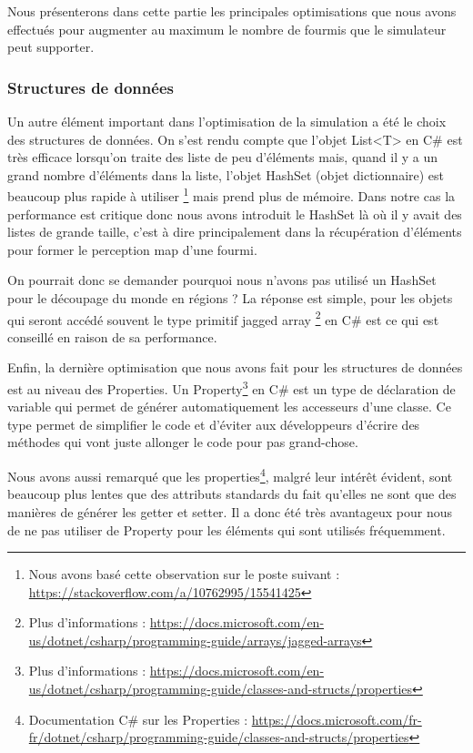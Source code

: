 \documentclass{EPUProjetDi}
\begin{document}
Nous présenterons dans cette partie les principales optimisations que nous avons effectués pour augmenter au maximum le nombre de fourmis que le simulateur peut supporter.

\subsubsection{Structures de données}
Un autre élément important dans l'optimisation de la simulation a été le choix des structures de données. 
On s'est rendu compte que l'objet List<T> en C\# est très efficace lorsqu'on traite des liste de peu d'éléments
mais, quand il y a un grand nombre d'éléments dans la liste, l'objet HashSet (objet dictionnaire) est beaucoup plus rapide à utiliser
\footnote{Nous avons basé cette observation sur le poste suivant : \url{https://stackoverflow.com/a/10762995/15541425}} mais prend plus de mémoire.
Dans notre cas la performance est critique donc nous avons introduit le HashSet là où il y avait des listes de grande taille, 
c'est à dire principalement dans la récupération d'éléments pour former le perception map d'une fourmi.

On pourrait donc se demander pourquoi nous n'avons pas utilisé un HashSet pour le découpage du monde en régions ? 
La réponse est simple, pour les objets qui seront accédé souvent le type primitif jagged array
\footnote{Plus d'informations : \url{https://docs.microsoft.com/en-us/dotnet/csharp/programming-guide/arrays/jagged-arrays}}
en C\# est ce qui est conseillé en raison de sa performance.

Enfin, la dernière optimisation que nous avons fait pour les structures de données est au niveau des Properties.
Un Property\footnote{Plus d'informations : \url{https://docs.microsoft.com/en-us/dotnet/csharp/programming-guide/classes-and-structs/properties}}
en C\# est un type de déclaration de variable qui permet de générer automatiquement les accesseurs d'une classe.
Ce type permet de simplifier le code et d'éviter aux développeurs d'écrire des méthodes qui vont juste allonger le code pour pas grand-chose.

Nous avons aussi remarqué que les properties\footnote{Documentation C\# sur les Properties : \url{https://docs.microsoft.com/fr-fr/dotnet/csharp/programming-guide/classes-and-structs/properties}}, malgré leur intérêt évident, sont beaucoup plus lentes que des attributs standards
du fait qu'elles ne sont que des manières de générer les getter et setter. 
Il a donc été très avantageux pour nous de ne pas utiliser de Property pour les éléments qui sont utilisés fréquemment.
\end{document}

